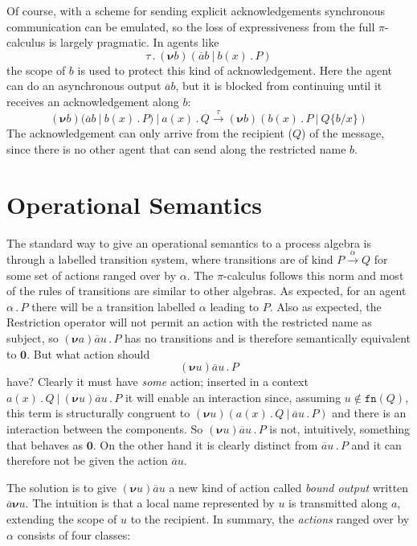 \documentclass[10pt,a4paper]{article}
\newcommand{\resp}[1]{(\boldsymbol{\nu}#1)}
\newcommand{\res}[2]{\resp{#1}#2}
\newcommand{\nil}{\mathbf{0}}
\newcommand{\outp}[2]{\overline{#1}#2}
\newcommand{\inpp}[2]{#1(#2)}
\newcommand{\silp}{\tau}
\newcommand{\prefix}[2]{{#1}\,.\,#2}
\newcommand{\boutp}[2]{\overline{#1}\boldsymbol{\nu}#2}
\newcommand{\out}[3]{\prefix{\outp{#1}{#2}}{#3}}
\newcommand{\inp}[3]{\prefix{\inpp{#1}{#2}}{#3}}
\newcommand{\sil}[1]{\prefix{\silp}{#1}}
\newcommand{\para}{\:|\:}
\newcommand{\fn}{\texttt{fn}}
\begin{document}
Of course, with a scheme for sending explicit acknowledgements synchronous communication can be emulated, so the loss of expressiveness from the full $\pi$-calculus is largely pragmatic. In agents like
\[
\sil{\res{b}{(\outp{a}{b} \para \inp{b}{x}{P})}}
\]
the scope of $b$ is used to protect this kind of acknowledgement. Here the agent can do an asynchronous output $\outp{a}{b}$, but it is blocked from continuing until it receives an acknowledgement along $b$:
\[
\res{b}{(\outp{a}{b} \para \inp{b}{x}{P})} \para \inp{a}{x}{Q} \overset{\tau}{\longrightarrow} \res{b}{(\inp{b}{x}{P} \para Q\{b/x\})}
\]
The acknowledgement can only arrive from the recipient ($Q$) of the message, since there is no other agent that can send along the restricted name $b$.

\section{Operational Semantics}

The standard way to give an operational semantics to a process algebra is through a labelled transition system, where transitions are of kind $P \overset{\alpha}{\longrightarrow} Q$ for some set of actions ranged over by $\alpha$. The $\pi$-calculus follows this norm and most of the rules of transitions are similar to other algebras. As expected, for an agent $\prefix{\alpha}{P}$ there will be a transition labelled $\alpha$ leading to $P$. Also as expected, the Restriction operator will not permit an action with the restricted name as subject, so $\res{a}{\out{a}{u}{P}}$ has no transitions and is therefore semantically equivalent to $\nil$. But what action should 
\[
\res{u}{\out{a}{u}{P}}
\]
have? Clearly it must have \emph{some} action; inserted in a context $\inp{a}{x}{Q} \para \res{u}{\out{a}{u}{P}}$ it will enable an interaction since, assuming $u \notin \fn(Q)$, this term is structurally congruent to $\res{u}{(\inp{a}{x}{Q} \para \out{a}{u}{P})}$ and there is an interaction between the components. So $\res{u}{\out{a}{u}{P}}$ is not, intuitively, something that behaves as $\nil$. On the other hand it is clearly distinct from $\out{a}{u}{P}$ and it can therefore not be given the action $\outp{a}{u}$. 

The solution is to give $\res{u}{\outp{a}{u}}$ a new kind of action called \emph{bound output} written $\boutp{a}{u}$. The intuition is that a local name represented by $u$ is transmitted along $a$, extending the scope of $u$ to the recipient. In summary, the \emph{actions} ranged over by $\alpha$ consists of four classes:
\end{document}
